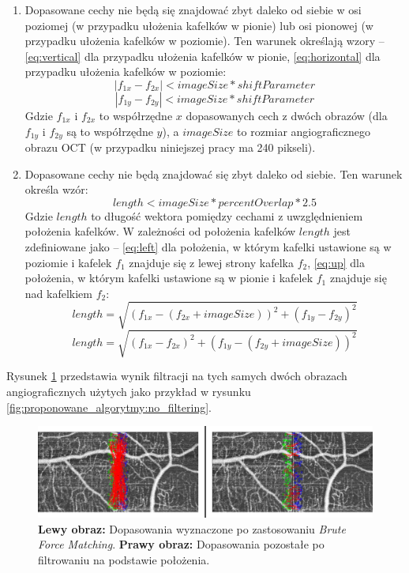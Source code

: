 \begin{enumerate}
\item Dopasowane cechy nie będą się znajdować zbyt daleko od siebie w osi poziomej (w przypadku ułożenia kafelków w pionie) lub osi pionowej (w przypadku ułożenia kafelków w poziomie). Ten warunek określają wzory -- \ref{eq:vertical} dla przypadku ułożenia kafelków w pionie, \ref{eq:horizontal} dla przypadku ułożenia kafelków w poziomie:
\begin{equation}
\left|f_{1x} - f_{2x}\right| < imageSize * shiftParameter
\label{eq:vertical}
\end{equation}
\begin{equation}
\left|f_{1y} - f_{2y}\right| < imageSize * shiftParameter
\label{eq:horizontal}
\end{equation}
Gdzie $f_{1x}$ i $f_{2x}$ to współrzędne $x$ dopasowanych cech z dwóch obrazów (dla $f_{1y}$ i $f_{2y}$ są to współrzędne $y$), a $imageSize$ to rozmiar angiograficznego obrazu OCT (w przypadku niniejszej pracy ma 240 pikseli).
\item Dopasowane cechy nie będą znajdować się zbyt daleko od siebie. Ten warunek określa wzór:
\begin{equation}
length < imageSize * percentOverlap * 2.5
\label{eq:length}
\end{equation}
Gdzie $length$ to długość wektora pomiędzy cechami z uwzględnieniem położenia kafelków. W zależności od położenia kafelków $length$ jest zdefiniowane jako -- \ref{eq:left} dla położenia, w którym kafelki ustawione są w poziomie i kafelek $f_{1}$ znajduje się z lewej strony kafelka $f_{2}$, \ref{eq:up} dla położenia, w którym kafelki ustawione są w pionie i kafelek $f_{1}$ znajduje się nad kafelkiem $f_{2}$:
\begin{equation}
length = \sqrt{(f_{1x} - (f_{2x} + imageSize))^2 + (f_{1y} - f_{2y})^2}
\label{eq:left}
\end{equation}
\begin{equation}
length = \sqrt{(f_{1x} - f_{2x})^2 + (f_{1y} - (f_{2y} + imageSize))^2}
\label{eq:up}
\end{equation}
\end{enumerate}

Rysunek \ref{fig:proponowane_algorytmy:after_placement} przedstawia wynik filtracji na tych samych dwóch obrazach angiograficznych użytych jako przykład w rysunku \ref{fig:proponowane_algorytmy:no_filtering}.

\begin{figure}[H]
  \centering
  \includegraphics[width=\textwidth]{gfx/after_placement}
  \caption{\textbf{Lewy obraz:} Dopasowania wyznaczone po zastosowaniu \textit{Brute Force Matching}. \textbf{Prawy obraz:} Dopasowania pozostałe po filtrowaniu na podstawie położenia.}
  \label{fig:proponowane_algorytmy:after_placement}
\end{figure}

